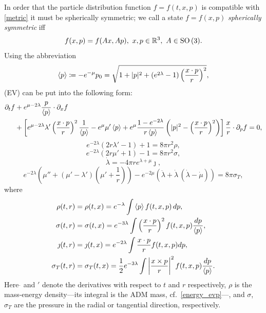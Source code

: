 \documentclass[11pt]{article}
\begin{document}
In order that the particle distribution function
$f=f(t,x,p)$ is compatible with \eqref{metric} it
must be spherically symmetric; we call a state $f=f(x,p)$
{\em spherically symmetric} iff
\begin{equation} \label{sphsydef}
  f(x,p) = f(Ax,Ap),\ x, p \in \mathbb R^3,\ A \in \mathrm{SO}\,(3).
\end{equation}
Using the abbreviation
\begin{equation} \label{p0p}
  \left\langle p\right\rangle \coloneqq - e^{-\mu}p_0
  = \sqrt{1+|p|^2 +(e^{2\lambda}-1)\left(\frac{x\cdot p}{r}\right)^2},
\end{equation}
(EV) can be put into the following form:
\begin{align} \label{vlasov_evp}
  \partial_t f
  &+ e^{\mu - 2\lambda}\frac{p}{\left\langle p\right\rangle}\cdot \partial_x f \nonumber\\
  &+
  \left[e^{\mu - 2\lambda}\lambda' \left(\frac{x\cdot p}{r}\right)^2\frac{1}{\left\langle p\right\rangle}
    - e^{\mu} \mu' \left\langle p\right\rangle + e^\mu\frac{1-e^{-2\lambda}}{r\left\langle p\right\rangle}
    \left(|p|^2 - \left(\frac{x\cdot p}{r}\right)^2\right) \right]
  \frac{x}{r} \cdot \partial_p f =0,
\end{align}
\begin{equation}
  e^{-2\lambda} (2 r \lambda' -1) +1
  =
  8\pi r^2 \rho , \label{ein1}
\end{equation}
\begin{equation}
  e^{-2\lambda} (2 r \mu' +1) -1
  =
  8\pi r^2 \sigma, \label{ein2}
\end{equation}
\begin{equation}
  \dot\lambda =
  - 4 \pi r e^{\lambda + \mu} \jmath, \label{ein3}
\end{equation}
\begin{equation}
  e^{- 2 \lambda} \left(\mu'' + (\mu' - \lambda')
  (\mu' + \frac{1}{r})\right)
  - e^{-2\mu}\left(\ddot\lambda +
  \dot\lambda \, (\dot\lambda - \dot\mu)\right)
  =
  8 \pi \sigma_T, \label{ein4}
\end{equation}
where
\begin{align}
  \rho(t,r)
  &=
  \rho(t,x) = e^{-\lambda} \int \left\langle p\right\rangle f(t,x,p)\,dp ,\label{rp}\\
  \sigma(t,r)
  &=
  \sigma(t,x) = e^{-3 \lambda} \int \left(\frac{x\cdot p}{r}\right)^2
  f(t,x,p)\frac{dp}{\left\langle p\right\rangle}, \label{pp}\\
  \jmath(t,r)
  &=
  \jmath(t,x) = e^{-2 \lambda} \int \frac{x\cdot p}{r} f(t,x,p) dp, \label{jp}\\
  \sigma_T(t,r)
  &=
  \sigma_T(t,x) = \frac{1}{2} e^{-3 \lambda}
  \int \left|{\frac{x\times p}{r}}\right|^2
  f(t,x,p) \frac{dp}{\left\langle p\right\rangle}. \label{pp_T}
\end{align}
Here $\dot{}$ and ${}'$ denote the derivatives with respect to
$t$ and $r$ respectively, $\rho$ is the mass-energy density---its integral
is the ADM mass, cf.~\eqref{energy_evp}---, and $\sigma$, $\sigma_T$
are the pressure in the radial or tangential direction, respectively.
\end{document}
